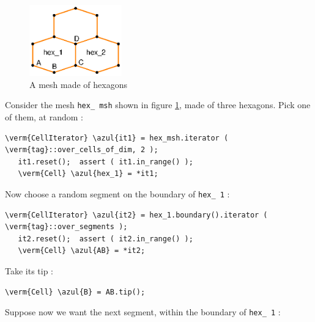 \begin{figure}[ht] \centering
  \includegraphics[width=40mm]{malha-hex}
  \caption{A mesh made of hexagons}
  \label{\numb section 9.\numb fig 3}
\end{figure}

Consider the mesh {\small\tt hex\_\,msh} shown in figure \ref{\numb section 9.\numb fig 3},
made of three hexagons.
Pick one of them, at random :

\begin{Verbatim}[commandchars=\\\{\},formatcom=\small\tt,
   baselinestretch=0.94,framesep=2mm                      ]
   \verm{CellIterator} \azul{it1} = hex_msh.iterator ( \verm{tag}::over_cells_of_dim, 2 );
   it1.reset();  assert ( it1.in_range() );
   \verm{Cell} \azul{hex_1} = *it1;
\end{Verbatim}

Now choose a random segment on the boundary of {\small\tt hex\_\,1} :

\begin{Verbatim}[commandchars=\\\{\},formatcom=\small\tt,
   baselinestretch=0.94,framesep=2mm                      ]
   \verm{CellIterator} \azul{it2} = hex_1.boundary().iterator ( \verm{tag}::over_segments );
   it2.reset();  assert ( it2.in_range() );
   \verm{Cell} \azul{AB} = *it2;
\end{Verbatim}

Take its tip :

\begin{Verbatim}[commandchars=\\\{\},formatcom=\small\tt,
   baselinestretch=0.94,framesep=2mm                      ]
   \verm{Cell} \azul{B} = AB.tip();
\end{Verbatim}

Suppose now we want the next segment, within the boundary of {\small\tt hex\_\,1} :

